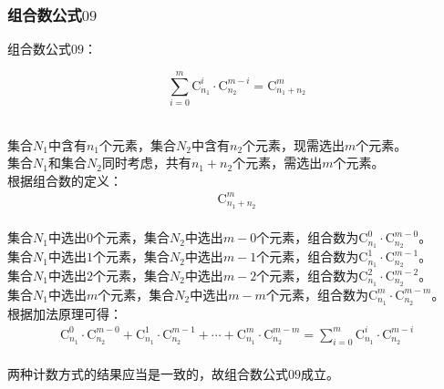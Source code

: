 \documentclass[UTF8]{ctexart}
\newcommand{\Co}{\mathrm{C}}
\begin{document}
\subsubsection{组合数公式$09$}
    组合数公式$09$：
    \begin{large}
        \begin{equation*}
            \sum_{i=0}^m\Co_{n_1}^i\cdot\Co_{n_2}^{m-i}=\Co_{n_1+n_2}^m
        \end{equation*}
    \end{large}\\
    集合$N_1$中含有$n_1$个元素，集合$N_2$中含有$n_2$个元素，现需选出$m$个元素。\\[3mm]
    集合$N_1$和集合$N_2$同时考虑，共有$n_1+n_2$个元素，需选出$m$个元素。\\[3mm]
    根据组合数的定义：
    \begin{align}
        \Co_{n_1+n_2}^m
    \end{align}\\
    集合$N_1$中选出$0$个元素，集合$N_2$中选出$m-0$个元素，组合数为$\Co_{n_1}^{0}\cdot\Co_{n_2}^{m-0}$。\\[3mm]
    集合$N_1$中选出$1$个元素，集合$N_2$中选出$m-1$个元素，组合数为$\Co_{n_1}^{1}\cdot\Co_{n_2}^{m-1}$。\\[3mm]
    集合$N_1$中选出$2$个元素，集合$N_2$中选出$m-2$个元素，组合数为$\Co_{n_1}^{2}\cdot\Co_{n_2}^{m-2}$。\\[3mm]
    集合$N_1$中选出$m$个元素，集合$N_2$中选出$m-m$个元素，组合数为$\Co_{n_1}^{m}\cdot\Co_{n_2}^{m-m}$。\\[3mm]
    根据加法原理可得：
    \setcounter{equation}{0}
    \begin{align}
        \Co_{n_1}^{0}\cdot\Co_{n_2}^{m-0}+\Co_{n_1}^{1}\cdot\Co_{n_2}^{m-1}+\cdots+\Co_{n_1}^{m}\cdot\Co_{n_2}^{m-m}=\sum_{i=0}^m\Co_{n_1}^i\cdot\Co_{n_2}^{m-i}
    \end{align}\\
    两种计数方式的结果应当是一致的，故组合数公式$09$成立。

\newpage
\end{document}
